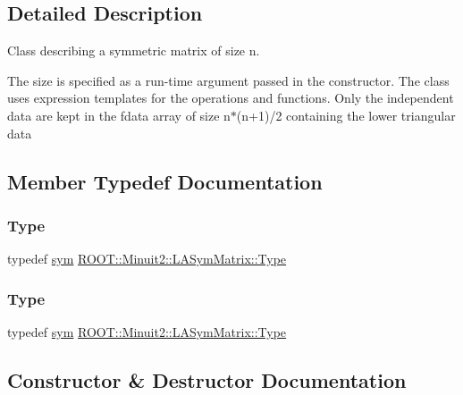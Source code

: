\subsection{Detailed Description}
Class describing a symmetric matrix of size n.

The size is specified as a run-\/time argument passed in the constructor. The class uses expression templates for the operations and functions. Only the independent data are kept in the fdata array of size n$\ast$(n+1)/2 containing the lower triangular data 

\subsection{Member Typedef Documentation}
\mbox{\label{classROOT_1_1Minuit2_1_1LASymMatrix_a339ed010f480472ba1029aef21c149ea}} 
\subsubsection{\texorpdfstring{Type}{Type}\hspace{0.1cm}{\footnotesize\ttfamily [1/2]}}
{\footnotesize\ttfamily typedef \mbox{\hyperlink{classROOT_1_1Minuit2_1_1sym}{sym}} \mbox{\hyperlink{classROOT_1_1Minuit2_1_1LASymMatrix_a339ed010f480472ba1029aef21c149ea}{R\+O\+O\+T\+::\+Minuit2\+::\+L\+A\+Sym\+Matrix\+::\+Type}}}

\mbox{\label{classROOT_1_1Minuit2_1_1LASymMatrix_a339ed010f480472ba1029aef21c149ea}} 
\subsubsection{\texorpdfstring{Type}{Type}\hspace{0.1cm}{\footnotesize\ttfamily [2/2]}}
{\footnotesize\ttfamily typedef \mbox{\hyperlink{classROOT_1_1Minuit2_1_1sym}{sym}} \mbox{\hyperlink{classROOT_1_1Minuit2_1_1LASymMatrix_a339ed010f480472ba1029aef21c149ea}{R\+O\+O\+T\+::\+Minuit2\+::\+L\+A\+Sym\+Matrix\+::\+Type}}}



\subsection{Constructor \& Destructor Documentation}
\mbox{\label{classROOT_1_1Minuit2_1_1LASymMatrix_a9fe58788095d0860bb44bde53457782c}} 
